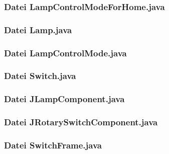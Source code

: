 \documentclass[11pt,ngerman]{article}
\begin{document}
\subsubsection{Datei LampControlModeForHome.java}

\vspace{.5cm}

\subsubsection{Datei Lamp.java}

\vspace{.5cm}

\subsubsection{Datei LampControlMode.java}

\vspace{.5cm}

\subsubsection{Datei Switch.java}

\vspace{.5cm}

\subsubsection{Datei JLampComponent.java}

\vspace{.5cm}

\subsubsection{Datei JRotarySwitchComponent.java}

\vspace{.5cm}

\subsubsection{Datei SwitchFrame.java}

\vspace{.5cm}
\end{document}

